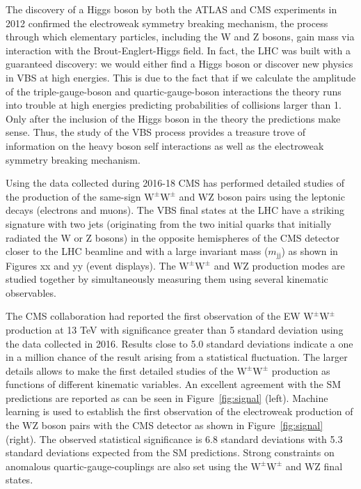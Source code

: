 \documentclass[12pt]{article}
\newcommand{\WZ}{\ensuremath{\mathrm{W}\mathrm{Z}}}
\newcommand{\WW}{\ensuremath{\mathrm{W}^\pm\mathrm{W}^\pm}}
\newcommand{\jet}{\ensuremath{\mathrm{j}}}
\newcommand{\mjj}{\ensuremath{m_{\jet\jet}}}
\begin{document}
The discovery of a Higgs boson by both the ATLAS and CMS experiments in 2012 confirmed the electroweak symmetry breaking mechanism, the process through which elementary particles, including the W and Z bosons, gain mass via interaction with the Brout-Englert-Higgs field.  In fact, the LHC was built with a guaranteed discovery: we would either find a Higgs boson or discover new physics in VBS at high energies. This is due to the fact that if we calculate the amplitude of the triple-gauge-boson and quartic-gauge-boson interactions the theory runs into trouble at high energies predicting probabilities of collisions larger than 1. Only after the inclusion of the Higgs boson in the theory the predictions make sense. Thus, the study of the VBS process provides a treasure trove of information on the heavy boson self interactions as well as the electroweak symmetry breaking mechanism.


Using the data collected during 2016-18 CMS has performed detailed studies of the production of the same-sign $\WW$ and $\WZ$ boson pairs using the leptonic decays (electrons and muons). The VBS final states at the LHC have a striking signature  with two jets (originating from the two initial quarks that initially radiated the W or Z bosons) in the opposite hemispheres of the CMS detector closer to the LHC beamline and with a large invariant mass ($\mjj$) as shown in Figures xx and yy (event displays). The $\WW$ and $\WZ$ production modes are studied together by simultaneously measuring them using several kinematic observables.  

The CMS collaboration had reported the first observation of the EW  $\WW$ production at 13 TeV with significance greater than 5 standard deviation using the data collected in 2016. Results close to 5.0 standard deviations indicate a one in a million chance of the result arising from a statistical fluctuation.  The larger details allows to make the first detailed studies of the $\WW$ production as functions of different kinematic variables. An excellent agreement with the SM predictions are reported as can be seen in Figure~\ref{fig:signal} (left). Machine learning is used to establish the first observation of the electroweak production of the $\WZ$ boson pairs with the CMS detector as shown in Figure~\ref{fig:signal} (right).  The observed statistical significance is 6.8 standard deviations with 5.3 standard deviations expected from the SM predictions. Strong constraints on anomalous quartic-gauge-couplings are also set using the $\WW$ and $\WZ$ final states. 
\end{document}
